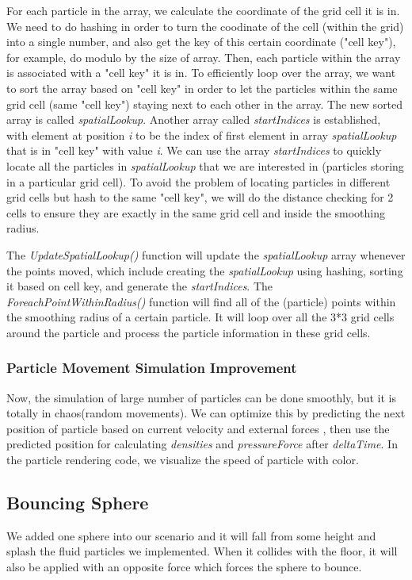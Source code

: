 \documentclass{article}
\begin{document}
For each particle in the array, we calculate the coordinate of the grid cell it is in. We need to do hashing in order to turn the coodinate of the cell (within the grid) into a single number, and also get the key of this certain coordinate ("cell key"), for example, do modulo by the size of array. Then, each particle within the array is associated with a "cell key" it is in. To efficiently loop over the array, we want to sort the array based on "cell key" in order to let the particles within the same grid cell (same "cell key") staying next to each other in the array. The new sorted array is called \textit{spatialLookup}. Another array called \textit{startIndices} is established, with element at position \textit{i} to be the index of first element in array \textit{spatialLookup} that is in "cell key" with value \textit{i}. We can use the array \textit{startIndices} to quickly locate all the particles in \textit{spatialLookup} that we are interested in (particles storing in a particular grid cell). To avoid the problem of locating particles in different grid cells but hash to the same "cell key", we will do the distance checking for 2 cells to ensure they are exactly in the same grid cell and inside the smoothing radius.  

The \textit{UpdateSpatialLookup()} function will update the \textit{spatialLookup} array whenever the points moved, which include creating the \textit{spatialLookup} using hashing, sorting it based on cell key, and generate the \textit{startIndices}. The \textit{ForeachPointWithinRadius()} function will find all of the (particle) points within the smoothing radius of a certain particle. It will loop over all the 3*3 grid cells around the particle and process the particle information in these grid cells. 

\subsubsection{Particle Movement Simulation Improvement}

Now, the simulation of large number of particles can be done smoothly, but it is totally in chaos(random movements). We can optimize this by predicting the next position of particle based on current velocity and external forces , then use the predicted position for calculating \textit{densities} and \textit{pressureForce} after \textit{deltaTime}. In the particle rendering code, we visualize the speed of particle with color.


\subsection{Bouncing Sphere}
 \hspace{1em} We added one sphere into our scenario and it will fall from some height and splash the fluid particles we implemented. When it collides with the floor, it will also be applied with an opposite force which forces the sphere to bounce.
\end{document}
